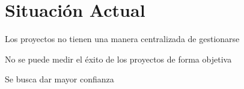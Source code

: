 \section{Situación Actual}

Los proyectos no tienen una manera centralizada de gestionarse

No se puede medir el éxito de los proyectos de forma objetiva

Se busca dar mayor confianza
